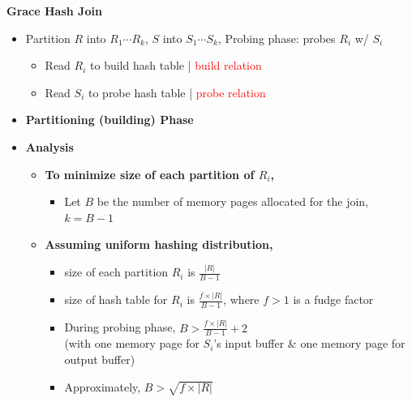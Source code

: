 \documentclass[10pt,landscape]{article}
\newcommand{\1}{\mathmybb{1}}
\begin{document}
\begin{multicols*}{3}
\textbf{Grace Hash Join}
\begin{itemize}
    \item Partition $R$ into $R_1 \cdots R_k$, $S$ into $S_1 \cdots S_k$, Probing phase: probes $R_i$ w/ $S_i$
    \begin{itemize}
        \item Read $R_i$ to build hash table | \textcolor{red}{build relation}
        \item Read $S_i$ to probe hash table | \textcolor{red}{probe relation}
    \end{itemize}
    \item \textbf{Partitioning (building) Phase} 
    \item \textbf{Analysis}
    \begin{itemize}
        \item \textbf{To minimize size of each partition of $R_i$,}
        \begin{itemize}
            \item Let $B$ be the number of memory pages allocated for the join, $k = B - 1$
        \end{itemize}
    
        \item \textbf{Assuming uniform hashing distribution,}
        \begin{itemize}
            \item size of each partition $R_i$ is $\frac{|R|}{B-1}$
            \item size of hash table for $R_i$ is $\frac{f \times |R|}{B-1}$, where $f > 1$ is a fudge factor
            \item During probing phase, $B > \frac{f \times |R|}{B-1} + 2$ \\ 
            (with one memory page for $S_i$'s input buffer \& one memory page for output buffer)
            \item Approximately, $B > \sqrt{f \times |R|}$
        \end{itemize}
    

\end{itemize}
\end{itemize}
\end{multicols*}
\end{document}
